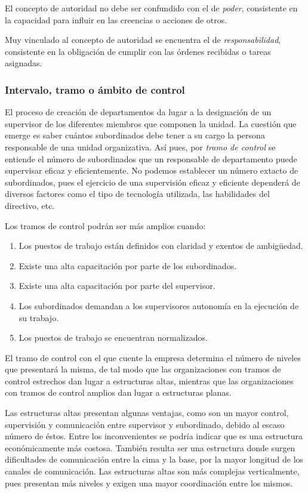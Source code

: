 \documentclass[12pt,a4paper,spanish]{report}
\begin{document}
				El concepto de autoridad no debe ser confundido con el de \emph{\textcolor[rgb]{0.5,0.1,0.4}{poder}}, consistente en la capacidad para influir en las creencias o acciones de otros.

				Muy vinculado al concepto de autoridad se encuentra el de \textcolor[rgb]{0.5,0.1,0.4}{\emph{responsabilidad}}, consistente en la obligación de cumplir con las órdenes recibidas o tareas asignadas.

			\subsubsection{\textcolor[rgb]{0.5,0.1,0.4}Intervalo, tramo o ámbito de control}
				El proceso de creación de departamentos da lugar a la designación de un supervisor de los diferentes miembros que componen la unidad. La cuestión que emerge es saber cuántos subordinados debe tener a su cargo la persona responsable de una unidad organizativa. Así pues, por \emph{\textcolor[rgb]{0.5,0.1,0.4}{tramo de control}} se entiende el número de subordinados que un responsable de departamento puede supervisar eficaz y eficientemente. No podemos establecer un número extacto de subordinados, pues el ejercicio de una supervisión eficaz y eficiente dependerá de diversos factores como el tipo de tecnología utilizada, las habilidades del directivo, etc.

				Los tramos de control podrán ser más amplios cuando:
				\begin{enumerate}
					\item Los puestos de trabajo están definidos con claridad y exentos de ambigüedad.
					\item Existe una alta capacitación por parte de los subordinados.
					\item Existe una alta capacitación por parte del supervisor.
					\item Los subordinados demandan a los supervisores autonomía en la ejecución de su trabajo.
					\item Los puestos de trabajo se encuentran normalizados.
				\end{enumerate}

				El tramo de control con el que cuente la empresa determina el número de niveles que presentará la misma, de tal modo que las organizaciones con tramos de control estrechos dan lugar a estructuras altas, mientras que las organizaciones con tramos de control amplios dan lugar a estructuras planas. 

				Las estructuras altas presentan algunas ventajas, como son un mayor control, supervisión y comunicación entre supervisor y subordinado, debido al escaso número de éstos. Entre los inconvenientes se podría indicar que es una estructura económicamente más costosa. También resulta ser una estructura donde surgen dificultades de comunicación entre la cima y la base, por la mayor longitud de los canales de comunicación. Las estructuras altas son más complejas verticalmente, pues presentan más niveles y exigen una mayor coordinación entre los mismos.
\end{document}
